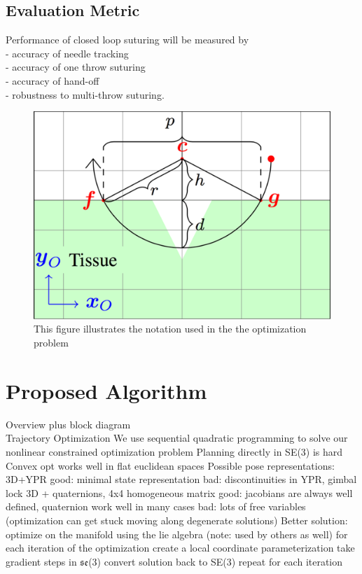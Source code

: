 \documentclass[0-suturing.tex]{subfiles}
\begin{document}
\subsection{Evaluation Metric}
Performance of closed loop suturing will be measured by\\
- accuracy of needle tracking \\
- accuracy of one throw suturing \\
- accuracy of hand-off \\
- robustness to multi-throw suturing.


\begin{figure}[!t]
\centering
\includegraphics[width=0.8\linewidth]{figures/Schematic}
\caption{ This figure illustrates the notation used in the the optimization problem }
\label{fig:notation}
\vspace{-10pt}
\end{figure}


\section{Proposed Algorithm}
\label{sec:approach}
Overview plus block diagram \\

Trajectory Optimization
We use sequential quadratic programming to solve our nonlinear constrained optimization problem
Planning directly in SE(3) is hard
Convex opt works well in flat euclidean spaces
Possible pose representations:
3D+YPR
good: minimal state representation
bad: discontinuities in YPR, gimbal lock
3D + quaternions, 4x4 homogeneous matrix
good: jacobians are always well defined, quaternion work well in many cases
bad: lots of free variables (optimization can get stuck moving along degenerate solutions)
Better solution: optimize on the manifold using the lie algebra (note: used by others as well)
for each iteration of the optimization create a local coordinate parameterization
take gradient steps in $\mathfrak{se}$(3)
convert solution back to SE(3)
repeat for each iteration
\end{document}
